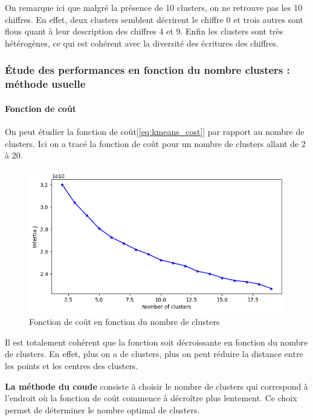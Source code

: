 \documentclass[french,a4paper,18pt]{article}
\begin{document}
On remarque ici que malgré la présence de 10 clusters, on ne retrouve pas les 10 chiffres.
En effet, deux clusters semblent décrirent le chiffre 0 et trois autres sont flous quant à leur description des chiffres 4 et 9.
Enfin les clusters sont très hétérogènes, ce qui est cohérent avec la diversité des écritures des chiffres.

\subsubsection{Étude des performances en fonction du nombre clusters : méthode usuelle}

\paragraph{Fonction de coût}
On peut étudier la fonction de coût[\ref{eq:kmeans_cost}] par rapport au nombre de clusters.
Ici on a tracé la fonction de coût pour un nombre de clusters allant de 2 à 20.

\begin{figure}[h!]
    \centering
    \includegraphics[scale=0.4]{images/mnist_kmeans_inertia.png}
    \caption{Fonction de coût en fonction du nombre de clusters}\label{fig:mnist_kmeans_cost}
\end{figure}

Il est totalement cohérent que la fonction soit décroissante en fonction du nombre de clusters.
En effet, plus on a de clusters, plus on peut réduire la distance entre les points et les centres des clusters.

\textbf{La méthode du coude} consiste à choisir le nombre de clusters qui correspond à l'endroit où la fonction de coût commence à décroître plus lentement.
Ce choix permet de déterminer le nombre optimal de clusters.
\end{document}
